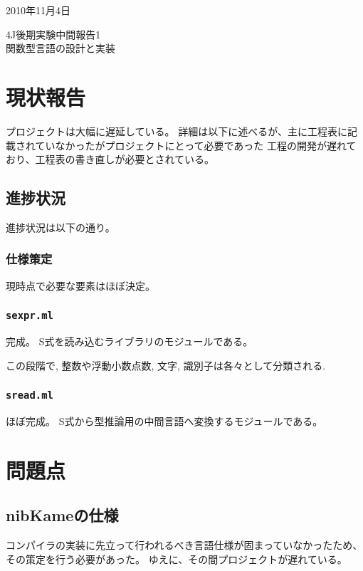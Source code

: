 \documentclass[a4paper, 10pt, oneside, notitlepage, onecolumn]{jsarticle}
\author{}
\begin{document}
\begin{flushright}
    2010年11月4日
\end{flushright}
\begin{center}
    4J後期実験中間報告1\\
\hspace{0.1em}
    \textsc{\LARGE 関数型言語の設計と実装}
\end{center}
\begin{flushright}
\end{flushright}
\section{現状報告}
プロジェクトは大幅に遅延している。
詳細は以下に述べるが、主に工程表に記載されていなかったがプロジェクトにとって必要であった
工程の開発が遅れており、工程表の書き直しが必要とされている。

\subsection{進捗状況}
進捗状況は以下の通り。

\subsubsection{仕様策定}
現時点で必要な要素はほぼ決定。

\subsubsection{\texttt{sexpr.ml}}
完成。
S式を読み込むライブラリのモジュールである。

この段階で, 整数や浮動小数点数, 文字, 識別子は各々として分類される.

\subsubsection{\texttt{sread.ml}}
ほぼ完成。
S式から型推論用の中間言語へ変換するモジュールである。

\section{問題点}
\subsection{nibKameの仕様}
コンパイラの実装に先立って行われるべき言語仕様が固まっていなかったため、その策定を行う必要があった。
ゆえに、その間プロジェクトが遅れている。
\end{document}
